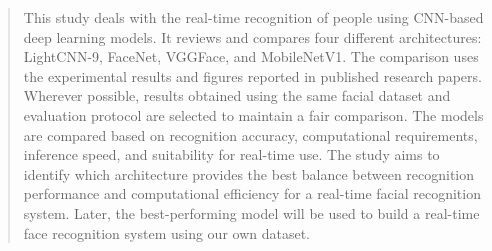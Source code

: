 \documentclass[11pt,a4paper,twocolumn]{article}
\begin{document}




\begin{abstract}

This study deals with the real-time recognition of people using CNN-based deep learning models. It reviews and compares four different architectures: LightCNN-9, FaceNet, VGGFace, and MobileNetV1. The comparison uses the experimental results and figures reported in published research papers. Wherever possible, results obtained using the same facial dataset and evaluation protocol are selected to maintain a fair comparison. The models are compared based on recognition accuracy, computational requirements, inference speed, and suitability for real-time use. The study aims to identify which architecture provides the best balance between recognition performance and computational efficiency for a real-time facial recognition system. Later, the best-performing model will be used to build a real-time face recognition system using our own dataset.

\end{abstract}
\end{document}
